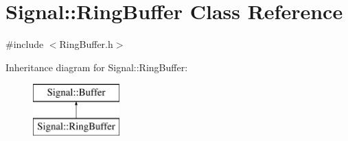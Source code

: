 \hypertarget{class_signal_1_1_ring_buffer}{\section{Signal\+:\+:Ring\+Buffer Class Reference}
\label{class_signal_1_1_ring_buffer}
}


{\ttfamily \#include $<$Ring\+Buffer.\+h$>$}

Inheritance diagram for Signal\+:\+:Ring\+Buffer\+:\begin{figure}[H]
\begin{center}
\leavevmode
\includegraphics[height=2.000000cm]{class_signal_1_1_ring_buffer}
\end{center}
\end{figure}
